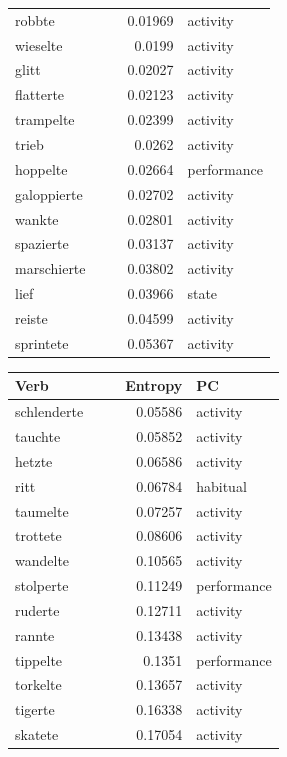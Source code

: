 \begin{table}[h!]
\begin{tabular}[t]{|l|c|c|r|l|}
        robbte &  &  & 0.01969 & activity\\
        wieselte &  &  & 0.0199 & activity\\
        glitt &  &  & 0.02027 & activity\\
        flatterte &  &  & 0.02123 & activity\\
        trampelte &  &  & 0.02399 & activity\\
        trieb &  &  & 0.0262 & activity\\
        hoppelte &  &  & 0.02664 & performance\\
        galoppierte &  &  & 0.02702 & activity\\
        wankte &  &  & 0.02801 & activity\\
        spazierte &  &  & 0.03137 & activity\\
        marschierte &  &  & 0.03802 & activity\\
        lief &  &  & 0.03966 & state\\
        reiste &  &  & 0.04599 & activity\\
        sprintete &  &  & 0.05367 & activity\\
    \end{tabular}
    \begin{tabular}[t]{|l|c|c|r|l|}
        \hline
        \textbf{Verb} & & & \textbf{Entropy} & \textbf{PC} \\
        \hline
        schlenderte &  &  & 0.05586 & activity\\
        tauchte &  &  & 0.05852 & activity\\
        hetzte &  &  & 0.06586 & activity\\
        ritt &  &  & 0.06784 & habitual\\
        taumelte &  &  & 0.07257 & activity\\
        trottete &  &  & 0.08606 & activity\\
        wandelte &  &  & 0.10565 & activity\\
        stolperte &  &  & 0.11249 & performance\\
        ruderte &  &  & 0.12711 & activity\\
        rannte &  &  & 0.13438 & activity\\
        tippelte &  &  & 0.1351 & performance\\
        torkelte &  &  & 0.13657 & activity\\
        tigerte &  &  & 0.16338 & activity\\
        skatete &  &  & 0.17054 & activity\\

\end{tabular}
\end{table}
